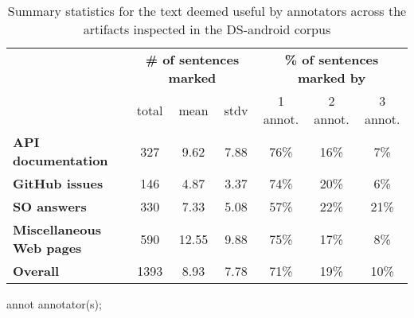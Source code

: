 \begin{table}[H]
\centering    
\caption{Summary statistics for the text deemed useful by annotators across the artifacts inspected in the \acs{DS-android} corpus}
\label{tbl:corpus-annotation-summary}
\begin{scriptsize}
\begin{threeparttable}
\begin{tabular}{lcccccc}





& \multicolumn{3}{c}{\textbf{\# of sentences marked}}
& \multicolumn{3}{c}{\textbf{\% of sentences marked by}}
\\ \cmidrule(l){2-4} \cmidrule(l){5-7} 
& total & mean & stdv 
& 1 annot. & 2 annot. & 3 annot. \\

\hline

\textbf{API documentation} 
& 327 & 9.62 & 7.88
& 76\% & 16\% & 7\%
\\
\textbf{GitHub issues} 
& 146 & 4.87 & 3.37
& 74\% & 20\% & 6\%
\\
\textbf{SO answers} 
& 330 & 7.33 & 5.08
& 57\% & 22\% & 21\%
\\
\textbf{Miscellaneous Web pages} 
& 590 & 12.55 & 9.88
& 75\% & 17\% & 8\%
\\

\hline
\textbf{Overall} 
& 1393 & 8.93 & 7.78
& 71\% & 19\% & 10\%
\\
\hline

\end{tabular}
\begin{tablenotes}
    \item[annot] annotator(s);
\end{tablenotes}
\end{threeparttable}
\end{scriptsize}
\end{table}

